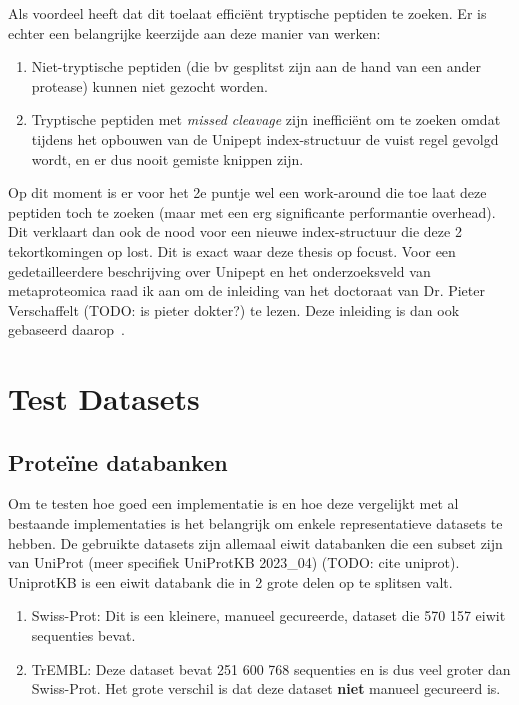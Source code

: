 \documentclass[11pt,dutch,faculty=we,layout=titlefont,underline=false,titleUppercase=true,titleUnderline=true]{ugent2016-report}
\begin{document}
    \leavevmode\newline
    Als voordeel heeft dat dit toelaat efficiënt tryptische peptiden te zoeken.
    Er is echter een belangrijke keerzijde aan deze manier van werken:
    \begin{enumerate}
        \item Niet-tryptische peptiden (die bv gesplitst zijn aan de hand van een ander protease) kunnen niet gezocht worden.
        \item Tryptische peptiden met \textit{missed cleavage} zijn inefficiënt om te zoeken omdat tijdens het opbouwen van de Unipept index-structuur de vuist regel gevolgd wordt, en er dus nooit gemiste knippen zijn.
    \end{enumerate}
    Op dit moment is er voor het 2e puntje wel een work-around die toe laat deze peptiden toch te zoeken (maar met een erg significante performantie overhead).
    Dit verklaart dan ook de nood voor een nieuwe index-structuur die deze 2 tekortkomingen op lost.
    Dit is exact waar deze thesis op focust.
    \newline
    Voor een gedetailleerdere beschrijving over Unipept en het onderzoeksveld van metaproteomica raad ik aan om de inleiding van het doctoraat van Dr. Pieter Verschaffelt (TODO: is pieter dokter?) te lezen.
    Deze inleiding is dan ook gebaseerd daarop~\cite{phdPieterUnipept}.


    \section{Test Datasets}\label{sec:datasets}

    \subsection{Proteïne databanken}
    Om te testen hoe goed een implementatie is en hoe deze vergelijkt met al bestaande implementaties is het belangrijk om enkele representatieve datasets te hebben.
    De gebruikte datasets zijn allemaal eiwit databanken die een subset zijn van UniProt (meer specifiek UniProtKB 2023\_04) (TODO: cite uniprot).
    UniprotKB is een eiwit databank die in 2 grote delen op te splitsen valt.
    \begin{enumerate}
        \item Swiss-Prot: Dit is een kleinere, manueel gecureerde, dataset die 570 157 eiwit sequenties bevat.
        \item TrEMBL: Deze dataset bevat 251 600 768 sequenties en is dus veel groter dan Swiss-Prot.
        Het grote verschil is dat deze dataset \textbf{niet} manueel gecureerd is.
    \end{enumerate}
\end{document}
